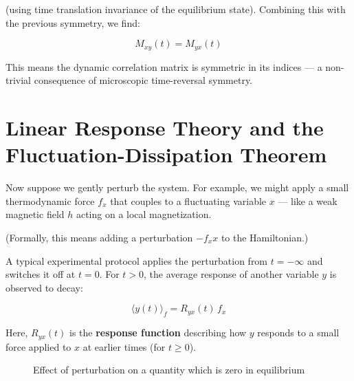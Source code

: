 \documentclass[
  letterpaper,
  enabledeprecatedfontcommands]{report}
\begin{document}
(using time translation invariance of the equilibrium state). Combining
this with the previous symmetry, we find:

\[
M_{xy}(t) = M_{yx}(t)
\]

This means the dynamic correlation matrix is symmetric in its indices
--- a non-trivial consequence of microscopic time-reversal symmetry.

\section{Linear Response Theory and the Fluctuation-Dissipation
Theorem}\label{linear-response-theory-and-the-fluctuation-dissipation-theorem}

Now suppose we gently perturb the system. For example, we might apply a
small thermodynamic force \(f_x\) that couples to a fluctuating variable
\(x\) --- like a weak magnetic field \(h\) acting on a local
magnetization.

(Formally, this means adding a perturbation \(-f_x x\) to the
Hamiltonian.)

A typical experimental protocol applies the perturbation from
\(t = -\infty\) and switches it off at \(t = 0\). For \(t > 0\), the
average response of another variable \(y\) is observed to decay:

\[
\langle y(t) \rangle_f = R_{yx}(t) \, f_x
\]

Here, \(R_{yx}(t)\) is the \textbf{response function} describing how
\(y\) responds to a small force applied to \(x\) at earlier times (for
\(t \geq 0\)).

\begin{figure}


\caption{\label{fig-perturbation}Eﬀect of perturbation on a quantity
which is zero in equilibrium}

\end{figure}%
\end{document}
